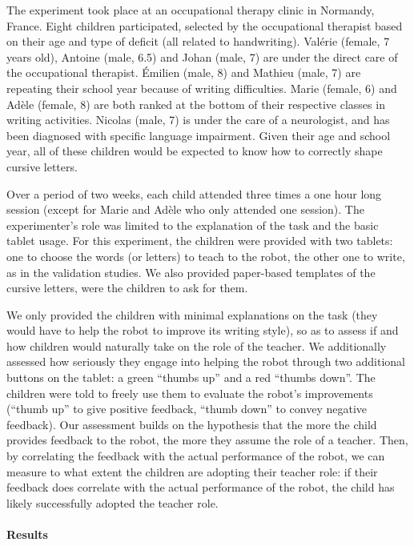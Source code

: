 \documentclass{article}
\begin{document}
The experiment took place at an occupational therapy clinic in
Normandy, France. Eight children participated, selected by the occupational
therapist based on their age and type of deficit (all related to handwriting).
Valérie (female, 7 years old), Antoine (male, 6.5) and Johan (male, 7) are under
the direct care of the occupational therapist. Émilien (male, 8) and Mathieu
(male, 7) are repeating their school year because of writing difficulties. Marie
(female, 6) and Adèle (female, 8) are both ranked at the bottom of their
respective classes in writing activities. Nicolas (male, 7) is under the care of
a neurologist, and has been diagnosed with specific language impairment. Given
their age and school year, all of these children would be expected to know how to
correctly shape cursive letters. 

Over a period of two weeks, each child attended three times a one hour long
session (except for Marie and Adèle who only attended one session). The
experimenter's role was limited to the explanation of the task and the basic
tablet usage. For this experiment, the children were provided with two tablets:
one to choose the words (or letters) to teach to the robot, the other one to
write, as in the validation studies. We also provided paper-based templates of
the cursive letters, were the children to ask for them.

We only provided the children with minimal explanations on the task (they would
have to help the robot to improve its writing style), so as to assess if and how
children would naturally take on the role of the teacher. We additionally assessed
how seriously they engage into helping the robot through two additional buttons
on the tablet: a green ``thumbs up'' and a red ``thumbs down''. The children
were told to freely use them to evaluate the robot's improvements (``thumb up''
to give positive feedback, ``thumb down'' to convey negative feedback). Our
assessment builds on the hypothesis that the more the child provides feedback to
the robot, the more they assume the role of a teacher. Then, by correlating the
feedback with the actual performance of the robot, we can measure to what extent
the children are adopting their teacher role: if their feedback does correlate
with the actual performance of the robot, the child has likely successfully
adopted the teacher role.


\paragraph{Results}
\end{document}
